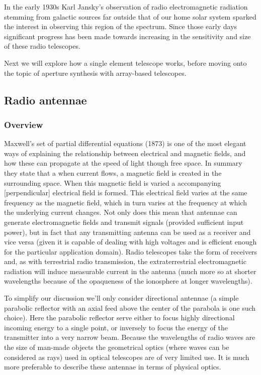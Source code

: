 \documentclass[a4paper,10pt]{report}
\begin{document}
In the early 1930s Karl Jansky's observation of radio electromagnetic radiation stemming from galactic sources far outside that of our home solar system sparked the interest in observing this region of 
the spectrum. Since those early days significant progress has been made towards increasing in the sensitivity and size of these radio telescopes. 

Next we will explore how a single element telescope works, before moving onto the topic of aperture synthesis with array-based telescopes.

\subsection{Radio antennae}
\subsubsection{Overview}
Maxwell's set of partial differential equations (1873) is one of the most elegant ways of explaining the relationship between electrical and magnetic fields, and how these can propagate at the speed of light 
though free space. In summary they state that a when current flows, a magnetic field is created in the surrounding space. When this magnetic field is varied a accompanying [perpendicular] electrical field is formed. This electrical field 
varies at the same frequency as the magnetic field, which in turn varies at the frequency at which the underlying current changes. Not only does this mean that antennae can generate electromagnetic fields and transmit signals (provided
sufficient input power), but in fact that any transmitting antenna can be used as a receiver and vice versa (given it is capable of dealing with high voltages and is efficient enough for the particular application domain). Radio telescopes 
take the form of receivers and, as with terrestrial radio transmission, the extraterrestrial electromagnetic radiation will induce measurable current in the antenna (much more so at shorter wavelengths 
because of the opaqueness of the ionosphere at longer wavelengths).

To simplify our discussion we'll only consider directional antennae (a simple parabolic reflector with an axial feed above the center of the parabola is 
one such choice). Here the parabolic reflector serve either to focus highly directional incoming energy to a single point, or inversely to 
focus the energy of the transmitter into a very narrow beam. Because the wavelengths of radio waves are the size of man-made objects the geometrical optics 
(where waves can be considered as rays) used in optical telescopes are of very limited use. It is much more preferable to describe these antennae in terms of 
physical optics.
\end{document}
